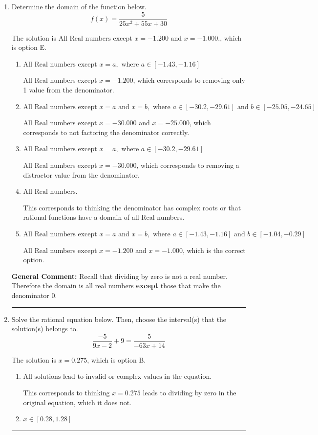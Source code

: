 \documentclass{extbook}[14pt]
\newcommand{\litem}[1]{\item #1

\rule{\textwidth}{0.4pt}}
\begin{document}
\begin{enumerate}\litem{
Determine the domain of the function below.
\[ f(x) = \frac{5}{25x^{2} +55 x + 30} \]

The solution is \( \text{All Real numbers except } x = -1.200 \text{ and } x = -1.000. \), which is option E.\begin{enumerate}[label=\Alph*.]
\item \( \text{All Real numbers except } x = a, \text{ where } a \in [-1.43, -1.16] \)

All Real numbers except $x = -1.200$, which corresponds to removing only 1 value from the denominator.
\item \( \text{All Real numbers except } x = a \text{ and } x = b, \text{ where } a \in [-30.2, -29.61] \text{ and } b \in [-25.05, -24.65] \)

All Real numbers except $x = -30.000$ and $x = -25.000$, which corresponds to not factoring the denominator correctly.
\item \( \text{All Real numbers except } x = a, \text{ where } a \in [-30.2, -29.61] \)

All Real numbers except $x = -30.000$, which corresponds to removing a distractor value from the denominator.
\item \( \text{All Real numbers.} \)

This corresponds to thinking the denominator has complex roots or that rational functions have a domain of all Real numbers.
\item \( \text{All Real numbers except } x = a \text{ and } x = b, \text{ where } a \in [-1.43, -1.16] \text{ and } b \in [-1.04, -0.29] \)

All Real numbers except $x = -1.200$ and $x = -1.000$, which is the correct option.
\end{enumerate}

\textbf{General Comment:} Recall that dividing by zero is not a real number. Therefore the domain is all real numbers \textbf{except} those that make the denominator 0.
}
\litem{
Solve the rational equation below. Then, choose the interval(s) that the solution(s) belongs to.
\[ \frac{-5}{9x -2} + 9 = \frac{5}{-63x + 14} \]

The solution is \( x = 0.275 \), which is option B.\begin{enumerate}[label=\Alph*.]
\item \( \text{All solutions lead to invalid or complex values in the equation.} \)

This corresponds to thinking $x = 0.275$ leads to dividing by zero in the original equation, which it does not.
\item \( x \in [0.28,1.28] \)


\end{enumerate}}
\end{enumerate}
\end{document}
